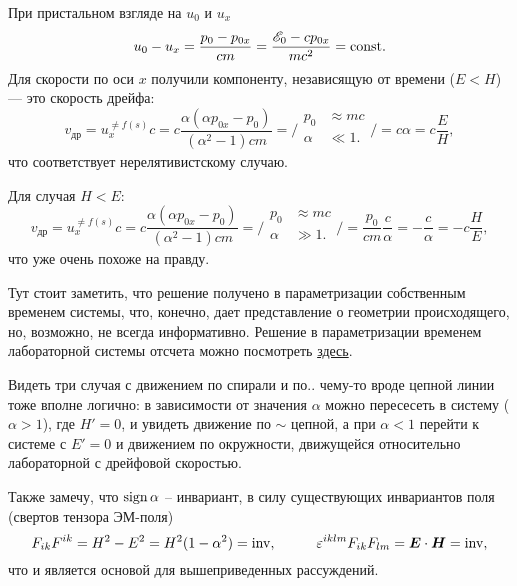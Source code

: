 При пристальном взгляде на $u_0$ и $u_x$ 
\begin{equation*}
	u_0 - u_x = \frac{p_0 - p_{0x}}{cm} = 
	\frac{\mathscr{E}_0 - c p_{0x}}{m c^2}
	=
	\text{const}.
\end{equation*}
Для скорости по оси $x$ получили компоненту, независящую от времени ($E < H$) --- это скорость дрейфа:
\begin{equation*}
	v_{\text{др}} = u_x^{\neq f(s)} c  = c
	\frac{\alpha  (\alpha  p_{0x}-p_0)}{\left(\alpha ^2-1\right) c m} = 
	\bigg/
	\begin{aligned}
	    p_0 &\approx m c\\
	    \alpha &\ll 1. \\
	\end{aligned}
	\bigg/ = c \alpha = c \frac{E}{H},
\end{equation*}
что соответствует нерелятивистскому случаю.

Для случая $H < E$:
\begin{equation*}
	v_{\text{др}} = u_x^{\neq f(s)} c  = c
	\frac{\alpha  (\alpha  p_{0x}-p_0)}{\left(\alpha ^2-1\right) c m} = 
	\bigg/
	\begin{aligned}
	    p_0 &\approx m c\\
	    \alpha &\gg 1. \\
	\end{aligned}
	\bigg/ = \frac{p_0}{cm} \frac{c}{\alpha} = 
	 -\frac{c}{\alpha} = -c \frac{H}{E},
\end{equation*}
что уже очень похоже на правду.

Тут стоит заметить, что решение получено в параметризации собственным временем системы, что, конечно, дает представление о геометрии происходящего, но, возможно, не всегда информативно. Решение в параметризации временем лабораторной системы отсчета можно посмотреть \href{http://www.mathnet.ru/links/fceb55e262fb1ac3ee2fb2b02d884543/tmf8881.pdf}{здесь}. 

Видеть три случая с движением по спирали и по.. чему-то вроде цепной линии тоже вполне логично: в зависимости от значения $\alpha$ можно пересесеть в систему ($\alpha > 1$), где $H' = 0$, и увидеть движение по $\sim$ цепной, а при $\alpha < 1$ перейти к системе с $E'=0$ и движением по окружности, движущейся относительно лабораторной с дрейфовой скоростью. 


Также замечу, что $\mathop{\mathrm{sign}}\nolimits \alpha$ -- инвариант, в силу существующих инвариантов поля (свертов тензора ЭМ-поля)
\begin{equation*}
	F_{ik} F^{ik} = H^2 - E^2 = H^2 (1 - \alpha^2) = \inv,
	\hspace{10 mm}
	\varepsilon^{iklm} F_{ik} F_{lm} = \vc{E} \cdot \vc{H} = \inv,
\end{equation*}
что и является основой для вышеприведенных рассуждений.